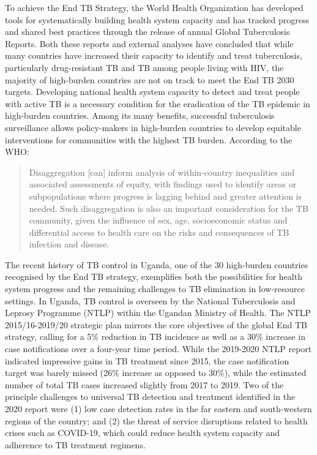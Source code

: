 \documentclass[
]{report}
\begin{document}
To achieve the End TB Strategy, the World Health Organization has developed tools for systematically building health system capacity\autocite{WHOWorldHealthOrganization2008,WorldHealthOrganization2020,WorldHealthOrganization2010} and has tracked progress and shared best practices through the release of annual Global Tuberculosis Reports.\autocite{WorldHealthOrganization2020a} Both these reports and external analyses have concluded that while many countries have increased their capacity to identify and treat tuberculosis, particularly drug-resistant TB and TB among people living with HIV, the majority of high-burden countries are not on track to meet the End TB 2030 targets.\autocite{WorldHealthOrganization2020a,Kyu2018} Developing national health system capacity to detect and treat people with active TB is a necessary condition for the eradication of the TB epidemic in high-burden countries.\autocite{WorldHealthOrganization2020a} Among its many benefits, successful tuberculosis surveillance allows policy-makers in high-burden countries to develop equitable interventions for communities with the highest TB burden. According to the WHO:

\begin{quote}
Disaggregation {[}can{]} inform analysis of within-country inequalities and associated assessments of equity, with findings used to identify areas or subpopulations where progress is lagging behind and greater attention is needed. Such disaggregation is also an important consideration for the TB community, given the influence of sex, age, socioeconomic status and differential access to health care on the risks and consequences of TB infection and disease.\autocite{WorldHealthOrganization2020a}
\end{quote}

The recent history of TB control in Uganda, one of the 30 high-burden countries recognised by the End TB strategy, exemplifies both the possibilities for health system progress and the remaining challenges to TB elimination in low-resource settings. In Uganda, TB control is overseen by the National Tuberculosis and Leprosy Programme (NTLP) within the Ugandan Ministry of Health. The NTLP 2015/16-2019/20 strategic plan mirrors the core objectives of the global End TB strategy, calling for a 5\% reduction in TB incidence as well as a 30\% increase in case notifications over a four-year time period.\autocite{UgandaNationalTuberculosisandLeprosyProgramme2017a} While the 2019-2020 NTLP report indicated impressive gains in TB treatment since 2015, the case notification target was barely missed (26\% increase as opposed to 30\%), while the estimated number of total TB cases increased slightly from 2017 to 2019.\autocite{UgandaNationalTuberculosisandLeprosyProgramme2020} Two of the principle challenges to universal TB detection and treatment identified in the 2020 report were (1) low case detection rates in the far eastern and south-western regions of the country; and (2) the threat of service disruptions related to health crises such as COVID-19, which could reduce health system capacity and adherence to TB treatment regimens.\autocite{UgandaNationalTuberculosisandLeprosyProgramme2020}
\end{document}
